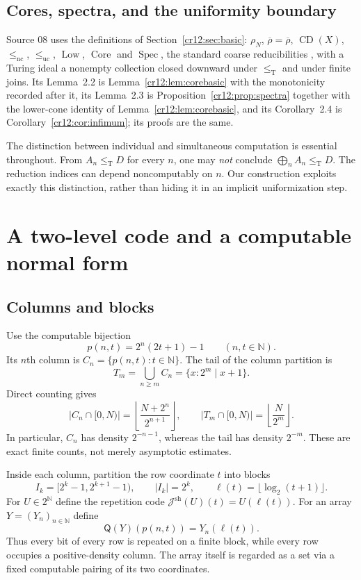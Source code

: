 \documentclass[11pt,letterpaper]{article}
\theoremstyle{plain}
\theoremstyle{definition}
\theoremstyle{remark}
\numberwithin{equation}{section}
\newcommand{\N}{\mathbb N}
\newcommand{\Cantor}{2^{\N}}
\newcommand{\leT}{\leq_{\mathrm T}}
\newcommand{\leuc}{\leq_{\mathrm{uc}}}
\newcommand{\lenc}{\leq_{\mathrm{nc}}}
\newcommand{\Core}{\operatorname{Core}}
\newcommand{\CD}{\operatorname{CD}}
\newcommand{\Low}{\operatorname{Low}}
\newcommand{\Spec}{\operatorname{Spec}}
\newcommand{\Dens}{\overline\rho}
\newcommand{\Jsh}{\mathcal J^{\mathrm{sh}}} %
\newcommand{\QQ}{\mathsf Q}              %
\begin{document}
\subsection{Cores, spectra, and the uniformity boundary}
Source 08 uses the definitions of Section~\ref{cr12:sec:basic}: $\rho_N$,
$\overline\rho=\Dens$, $\CD(X)$, $\lenc$, $\leuc$, $\Low$, $\Core$ and $\Spec$, the
standard coarse reducibilities \cite{HJKS,Gerdes}, with a Turing ideal a nonempty
collection closed downward under $\leT$ and under finite joins. Its Lemma~2.2 is
Lemma~\ref{cr12:lem:corebasic} with the monotonicity recorded after it, its Lemma~2.3
is Proposition~\ref{cr12:prop:spectra} together with the lower-cone identity of
Lemma~\ref{cr12:lem:corebasic}, and its Corollary~2.4 is
Corollary~\ref{cr12:cor:infimum}; its proofs are the same.

The distinction between individual and simultaneous computation is essential
throughout. From $A_n\leT D$ for every $n$, one may \emph{not} conclude
$\bigoplus_n A_n\leT D$. The reduction indices can depend noncomputably on $n$. Our
construction exploits exactly this distinction, rather than hiding it in an
implicit uniformization step.

\section{A two-level code and a computable normal form}\label{cr12:ep:sec:normal}

\subsection{Columns and blocks}
Use the computable bijection
\begin{equation}\label{cr12:ep:eq:pairing}
 p(n,t)=2^n(2t+1)-1\qquad(n,t\in\N).
\end{equation}
Its $n$th column is $C_n=\{p(n,t):t\in\N\}$. The tail of the column partition is
\[
 T_m=\bigcup_{n\ge m}C_n=\{x:2^m\mid x+1\}.
\]
Direct counting gives
\begin{equation}\label{cr12:ep:eq:counts}
 |C_n\cap[0,N)|=\left\lfloor\frac{N+2^n}{2^{n+1}}\right\rfloor,
 \qquad |T_m\cap[0,N)|=\left\lfloor\frac{N}{2^m}\right\rfloor.
\end{equation}
In particular, $C_n$ has density $2^{-n-1}$, whereas the tail has density $2^{-m}$.
These are exact finite counts, not merely asymptotic estimates.

Inside each column, partition the row coordinate $t$ into blocks
\begin{equation}\label{cr12:ep:eq:blocks}
 I_k=[2^k-1,2^{k+1}-1),\qquad |I_k|=2^k,
 \qquad \ell(t)=\lfloor\log_2(t+1)\rfloor.
\end{equation}
For $U\in\Cantor$ define the repetition code $\Jsh(U)(t)=U(\ell(t))$. For an array
$Y=(Y_n)_{n\in\N}$ define
\begin{equation}\label{cr12:ep:eq:Q}
 \QQ(Y)(p(n,t))=Y_n(\ell(t)).
\end{equation}
Thus every bit of every row is repeated on a finite block, while every row occupies
a positive-density column. The array itself is regarded as a set via a fixed
computable pairing of its two coordinates.
\end{document}
